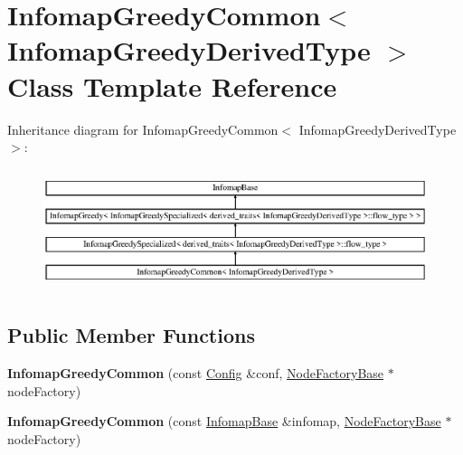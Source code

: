 \hypertarget{classInfomapGreedyCommon}{}\section{Infomap\+Greedy\+Common$<$ Infomap\+Greedy\+Derived\+Type $>$ Class Template Reference}
\label{classInfomapGreedyCommon}
Inheritance diagram for Infomap\+Greedy\+Common$<$ Infomap\+Greedy\+Derived\+Type $>$\+:\begin{figure}[H]
\begin{center}
\leavevmode
\includegraphics[height=3.584000cm]{classInfomapGreedyCommon}
\end{center}
\end{figure}
\subsection*{Public Member Functions}
\begin{DoxyCompactItemize}
\item 
\mbox{\label{classInfomapGreedyCommon_a8889c3cd57d341ee75ae9c13b7d77dee}} 
{\bfseries Infomap\+Greedy\+Common} (const \mbox{\hyperlink{structConfig}{Config}} \&conf, \mbox{\hyperlink{classNodeFactoryBase}{Node\+Factory\+Base}} $\ast$node\+Factory)
\item 
\mbox{\label{classInfomapGreedyCommon_a3d115399a2be685d098a372faa969d32}} 
{\bfseries Infomap\+Greedy\+Common} (const \mbox{\hyperlink{classInfomapBase}{Infomap\+Base}} \&infomap, \mbox{\hyperlink{classNodeFactoryBase}{Node\+Factory\+Base}} $\ast$node\+Factory)
\end{DoxyCompactItemize}
